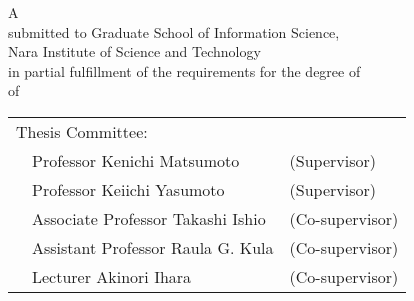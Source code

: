 \renewcommand\thepage{Title2}
\thispagestyle{empty}
\vspace*{8.9truecm}
\begin{center}
 A \edoctitle \\
 submitted to Graduate School of Information Science, \\
 Nara Institute of Science and Technology \\
 in partial fulfillment of the requirements for the degree of \\
 {\degree} of \major \\
 \bigskip

 \eauthor

 \vspace*{4.8truemm}

 \centering
 \begin{tabular}[t]{p{}ll}
  \multicolumn{2}{l}{Thesis Committee:} \\
  & Professor Kenichi Matsumoto & (Supervisor) \\
  & Professor Keiichi Yasumoto & (Supervisor) \\
  & Associate Professor Takashi Ishio & (Co-supervisor) \\
  & Assistant Professor Raula G. Kula & (Co-supervisor) \\
  & Lecturer Akinori Ihara & (Co-supervisor)
 \end{tabular}
\end{center}